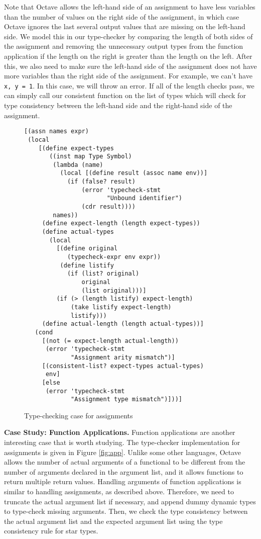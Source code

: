 Note that Octave allows the left-hand side of an assignment to have less variables than the number of values on the right side of the assignment, in which case Octave ignores the last several output values that are missing on the left-hand side. We model this in our type-checker by comparing the length of both sides of the assignment and removing the unnecessary output types from the function application if the length on the right is greater than the length on the left. After this, we also need to make sure the left-hand side of the assignment does not have more variables than the right side of the assignment. For example, we can't have {\tt x, y = 1}. In this case, we will throw an error. If all of the length checks pass, we can simply call our consistent function on the list of types which will check for type consistency between the left-hand side and the right-hand side of the assignment.  

\begin{figure}[h]
    \begin{lstlisting}[language=racket]
[(assn names expr)
 (local
    [(define expect-types
       ((inst map Type Symbol)
        (lambda (name)
          (local [(define result (assoc name env))]
            (if (false? result)
                (error 'typecheck-stmt
                       "Unbound identifier")
                (cdr result))))
        names))
     (define expect-length (length expect-types))
     (define actual-types
       (local
         [(define original
            (typecheck-expr env expr))
          (define listify
            (if (list? original)
                original
                (list original)))]
         (if (> (length listify) expect-length)
             (take listify expect-length)
             listify)))
     (define actual-length (length actual-types))]
   (cond
     [(not (= expect-length actual-length))
      (error 'typecheck-stmt
             "Assignment arity mismatch")]
     [(consistent-list? expect-types actual-types)
      env]
     [else
      (error 'typecheck-stmt
             "Assignment type mismatch")]))]
    \end{lstlisting}
    \caption[]{Type-checking case for assignments}
    \label{fig:assn}
\end{figure}


{\bf Case Study: Function Applications.} Function applications are another interesting case that is worth studying. The type-checker implementation for assignments is given in Figure \ref{fig:app}. Unlike some other languages, Octave allows the number of actual arguments of a functional to be different from the number of arguments declared in the argument list, and it allows functions to return multiple return values. Handling arguments of function applications is similar to handling assignments, as described above. Therefore, we need to truncate the actual argument list if necessary, and append dummy dynamic types to type-check missing arguments. Then, we check the type consistency between the actual argument list and the expected argument list using the type consistency rule for star types.

